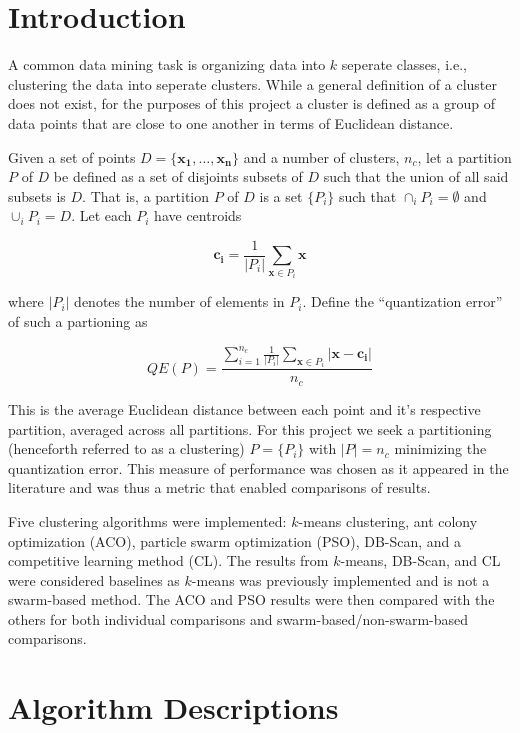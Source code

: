 \documentclass[conference]{IEEEtran}
\begin{document}
\section{Introduction}
\label{intro}
A common data mining task is organizing data into $k$ seperate classes, i.e., clustering the data into seperate clusters. While a general definition of a cluster does not exist, for the purposes of this project a cluster is defined as a group of data points that are close to one another in terms of Euclidean distance.

Given a set of points $D = \{\mathbf{x_1}, \ldots, \mathbf{x_n}\}$ and a number of clusters, $n_c$, let a partition $P$ of $D$ be defined as a set of disjoints subsets of $D$ such that the union of all said subsets is $D$. That is, a partition $P$ of $D$ is a set $\{ P_i\}$ such that $\cap_i P_i = \emptyset $ and $\cup_i P_i = D $. Let each $P_i$ have centroids

$$ \mathbf{c_i} = \frac{1}{|P_i|}\sum_{\mathbf{x} \in P_i} \mathbf{x}$$

where $|P_i|$ denotes the number of elements in $P_i$. Define the ``quantization error'' of such a partioning as

\begin{equation} \label{eq:quant}
  QE(P) = \frac{\sum_{i=1}^{n_c} \frac{1}{|P_i|} \sum_{\mathbf{x} \in P_i} |\mathbf{x} - \mathbf{c_i}|}{n_c}
\end{equation}

This is the average Euclidean distance between each point and it's respective partition, averaged across all partitions. For this project we seek a partitioning (henceforth referred to as a clustering) $P = \{ P_i\}$ with $|P| = n_c$ minimizing the quantization error. This measure of performance was chosen as it appeared in the literature \cite{runkler} and was thus a metric that enabled comparisons of results.

Five clustering algorithms were implemented: $k$-means clustering, ant colony optimization (ACO), particle swarm optimization (PSO), DB-Scan, and a competitive learning method (CL). The results from $k$-means, DB-Scan, and CL were considered baselines as $k$-means was previously implemented and is not a swarm-based method. The ACO and PSO results were then compared with the others for both individual comparisons and swarm-based/non-swarm-based comparisons.
  
\section{Algorithm Descriptions}
\end{document}
